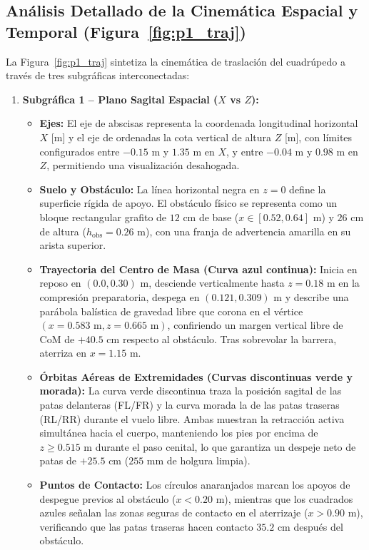 \documentclass[11pt,a4paper]{article}
\begin{document}
\subsection{Análisis Detallado de la Cinemática Espacial y Temporal (Figura~\ref{fig:p1_traj})}
La Figura~\ref{fig:p1_traj} sintetiza la cinemática de traslación del cuadrúpedo a través de tres subgráficas interconectadas:

\begin{enumerate}
    \item \textbf{Subgráfica 1 -- Plano Sagital Espacial ($X$ vs $Z$):}
    \begin{itemize}
        \item \textbf{Ejes:} El eje de abscisas representa la coordenada longitudinal horizontal $X$ [m] y el eje de ordenadas la cota vertical de altura $Z$ [m], con límites configurados entre $-0.15\text{ m}$ y $1.35\text{ m}$ en $X$, y entre $-0.04\text{ m}$ y $0.98\text{ m}$ en $Z$, permitiendo una visualización desahogada.
        \item \textbf{Suelo y Obstáculo:} La línea horizontal negra en $z = 0$ define la superficie rígida de apoyo. El obstáculo físico se representa como un bloque rectangular grafito de $12\text{ cm}$ de base ($x \in [0.52, 0.64]\text{ m}$) y $26\text{ cm}$ de altura ($h_{\text{obs}} = 0.26\text{ m}$), con una franja de advertencia amarilla en su arista superior.
        \item \textbf{Trayectoria del Centro de Masa (Curva azul continua):} Inicia en reposo en $(0.0, 0.30)\text{ m}$, desciende verticalmente hasta $z = 0.18\text{ m}$ en la compresión preparatoria, despega en $(0.121, 0.309)\text{ m}$ y describe una parábola balística de gravedad libre que corona en el vértice $(x = 0.583\text{ m}, z = 0.665\text{ m})$, confiriendo un margen vertical libre de CoM de $+40.5\text{ cm}$ respecto al obstáculo. Tras sobrevolar la barrera, aterriza en $x = 1.15\text{ m}$.
        \item \textbf{Órbitas Aéreas de Extremidades (Curvas discontinuas verde y morada):} La curva verde discontinua traza la posición sagital de las patas delanteras (FL/FR) y la curva morada la de las patas traseras (RL/RR) durante el vuelo libre. Ambas muestran la retracción activa simultánea hacia el cuerpo, manteniendo los pies por encima de $z \ge 0.515\text{ m}$ durante el paso cenital, lo que garantiza un despeje neto de patas de $+25.5\text{ cm}$ ($255\text{ mm}$ de holgura limpia).
        \item \textbf{Puntos de Contacto:} Los círculos anaranjados marcan los apoyos de despegue previos al obstáculo ($x < 0.20\text{ m}$), mientras que los cuadrados azules señalan las zonas seguras de contacto en el aterrizaje ($x > 0.90\text{ m}$), verificando que las patas traseras hacen contacto $35.2\text{ cm}$ después del obstáculo.
    \end{itemize}


\end{enumerate}
\end{document}
